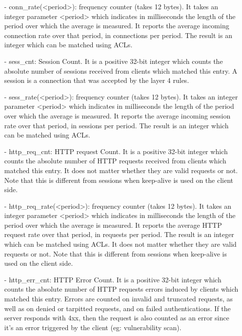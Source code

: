 {\begin{itemize}
  \item[-] conn\_rate(<period>): frequency counter (takes 12 bytes). It takes an
      integer parameter <period> which indicates in milliseconds the length
      of the period over which the average is measured. It reports the average
      incoming connection rate over that period, in connections per period. The
      result is an integer which can be matched using ACLs.

  \item[-] sess\_cnt: Session Count. It is a positive 32-bit integer which counts
      the absolute number of sessions received from clients which matched this
      entry. A session is a connection that was accepted by the layer 4 rules.

  \item[-] sess\_rate(<period>): frequency counter (takes 12 bytes). It takes an
      integer parameter <period> which indicates in milliseconds the length
      of the period over which the average is measured. It reports the average
      incoming session rate over that period, in sessions per period. The
      result is an integer which can be matched using ACLs.

  \item[-] http\_req\_cnt: HTTP request Count. It is a positive 32-bit integer which
      counts the absolute number of HTTP requests received from clients which
      matched this entry. It does not matter whether they are valid requests or
      not. Note that this is different from sessions when keep-alive is used on
      the client side.

  \item[-] http\_req\_rate(<period>): frequency counter (takes 12 bytes). It takes an
      integer parameter <period> which indicates in milliseconds the length
      of the period over which the average is measured. It reports the average
      HTTP request rate over that period, in requests per period. The result is
      an integer which can be matched using ACLs. It does not matter whether
      they are valid requests or not. Note that this is different from sessions
      when keep-alive is used on the client side.

  \item[-] http\_err\_cnt: HTTP Error Count. It is a positive 32-bit integer which
      counts the absolute number of HTTP requests errors induced by clients
      which matched this entry. Errors are counted on invalid and truncated
      requests, as well as on denied or tarpitted requests, and on failed
      authentications. If the server responds with 4xx, then the request is
      also counted as an error since it's an error triggered by the client
      (eg: vulnerability scan).


\end{itemize}}
